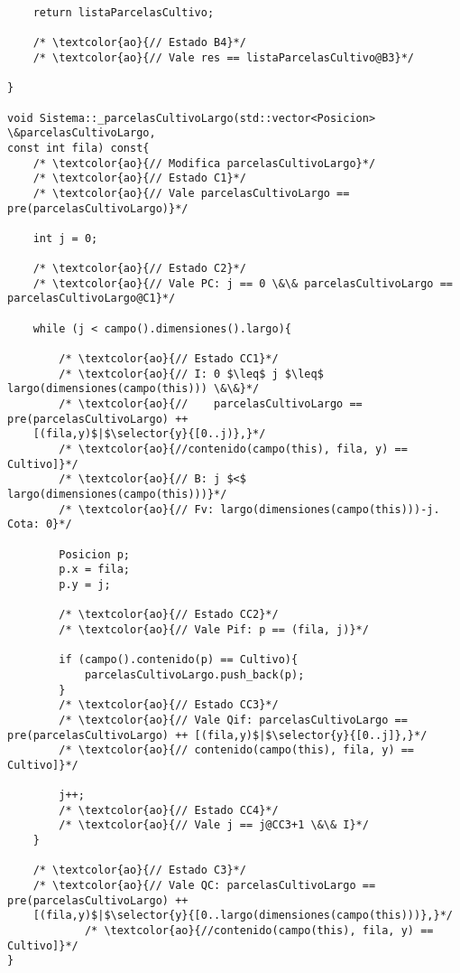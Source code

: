 \begin{lstlisting}
    return listaParcelasCultivo;
    
    /* \textcolor{ao}{// Estado B4}*/	    
    /* \textcolor{ao}{// Vale res == listaParcelasCultivo@B3}*/    
    
}

void Sistema::_parcelasCultivoLargo(std::vector<Posicion> \&parcelasCultivoLargo, 
const int fila) const{
    /* \textcolor{ao}{// Modifica parcelasCultivoLargo}*/	        
    /* \textcolor{ao}{// Estado C1}*/	    
    /* \textcolor{ao}{// Vale parcelasCultivoLargo == pre(parcelasCultivoLargo)}*/      
    
    int j = 0;
	
    /* \textcolor{ao}{// Estado C2}*/	    
    /* \textcolor{ao}{// Vale PC: j == 0 \&\& parcelasCultivoLargo == parcelasCultivoLargo@C1}*/      
    
    while (j < campo().dimensiones().largo){

    	/* \textcolor{ao}{// Estado CC1}*/	    
    	/* \textcolor{ao}{// I: 0 $\leq$ j $\leq$ largo(dimensiones(campo(this))) \&\&}*/        
    	/* \textcolor{ao}{//    parcelasCultivoLargo == pre(parcelasCultivoLargo) ++ 
    [(fila,y)$|$\selector{y}{[0..j)},}*/
    	/* \textcolor{ao}{//contenido(campo(this), fila, y) == Cultivo]}*/ 
    	/* \textcolor{ao}{// B: j $<$ largo(dimensiones(campo(this)))}*/   
    	/* \textcolor{ao}{// Fv: largo(dimensiones(campo(this)))-j. Cota: 0}*/
	     
        Posicion p;
        p.x = fila;
        p.y = j;

    	/* \textcolor{ao}{// Estado CC2}*/   
    	/* \textcolor{ao}{// Vale Pif: p == (fila, j)}*/
        
        if (campo().contenido(p) == Cultivo){
            parcelasCultivoLargo.push_back(p);
        }
    	/* \textcolor{ao}{// Estado CC3}*/
    	/* \textcolor{ao}{// Vale Qif: parcelasCultivoLargo == pre(parcelasCultivoLargo) ++ [(fila,y)$|$\selector{y}{[0..j]},}*/
    	/* \textcolor{ao}{// contenido(campo(this), fila, y) == Cultivo]}*/

        j++;
    	/* \textcolor{ao}{// Estado CC4}*/   
    	/* \textcolor{ao}{// Vale j == j@CC3+1 \&\& I}*/
    }
	
    /* \textcolor{ao}{// Estado C3}*/	    
    /* \textcolor{ao}{// Vale QC: parcelasCultivoLargo == pre(parcelasCultivoLargo) ++ 
    [(fila,y)$|$\selector{y}{[0..largo(dimensiones(campo(this)))},}*/
    	    /* \textcolor{ao}{//contenido(campo(this), fila, y) == Cultivo]}*/      
}


\end{lstlisting}
